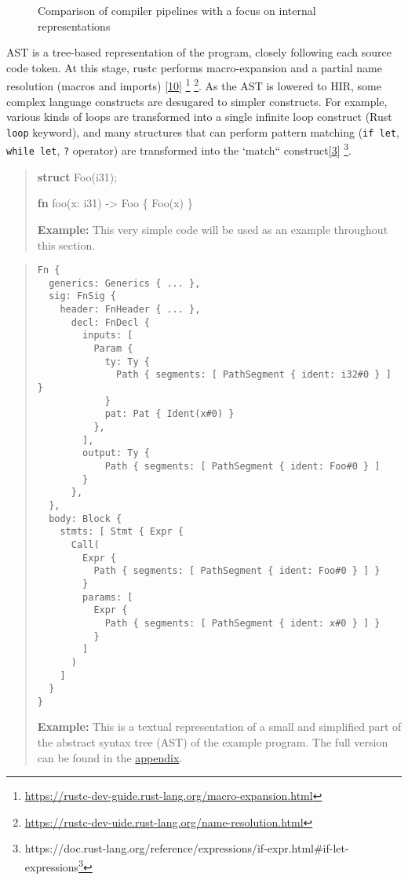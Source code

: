 \documentclass[
  11pt,
  twoside,symmetric]{report}
\newenvironment{Shaded}{}{}
\newcommand{\KeywordTok}[1]{\textbf{#1}}
\newcommand{\NormalTok}[1]{#1}
\newcommand{\OperatorTok}[1]{#1}
\DeclareRobustCommand{\href}[2]{#2\footnote{\url{#1}}}
\begin{document}
\begin{figure}
\centering

\caption{Comparison of compiler pipelines with a focus on internal
representations}
\end{figure}

AST is a tree-based representation of the program, closely following
each source code token. At this stage, rustc performs macro-expansion
and a partial name resolution (macros and imports)
\protect\hyperlink{ref-devguide}{{[}10{]}} \footnote{\url{https://rustc-dev-guide.rust-lang.org/macro-expansion.html}}
\footnote{\url{https://rustc-dev-uide.rust-lang.org/name-resolution.html}}.
As the AST is lowered to HIR, some complex language constructs are
desugared to simpler constructs. For example, various kinds of loops are
transformed into a single infinite loop construct (Rust \texttt{loop}
keyword), and many structures that can perform pattern matching
(\texttt{if\ let}, \texttt{while\ let}, \texttt{?} operator) are
transformed into the `match``
construct\protect\hyperlink{ref-reference}{{[}3{]}} \footnote{\href{https://doc.rust-lang.\%20org/reference/expressions/if-expr.html\#if-let-expressions}{https://doc.rust-lang.org/reference/expressions/if-expr.html\#if-let-expressions}}.

\begin{quote}
\begin{Shaded}
\begin{Highlighting}[]
\KeywordTok{struct}\NormalTok{ Foo(i31)}\OperatorTok{;}

\KeywordTok{fn}\NormalTok{ foo(x}\OperatorTok{:}\NormalTok{ i31) }\OperatorTok{{-}\textgreater{}}\NormalTok{ Foo }\OperatorTok{\{}
\NormalTok{    Foo(x)}
\OperatorTok{\}}
\end{Highlighting}
\end{Shaded}

\textbf{Example:} This very simple code will be used as an example
throughout this section.
\end{quote}

\begin{quote}
\begin{verbatim}
Fn {
  generics: Generics { ... },
  sig: FnSig {
    header: FnHeader { ... },
      decl: FnDecl {
        inputs: [
          Param {
            ty: Ty {
              Path { segments: [ PathSegment { ident: i32#0 } ] }
            }
            pat: Pat { Ident(x#0) }
          },
        ],
        output: Ty {
            Path { segments: [ PathSegment { ident: Foo#0 } ]
        }
      },
  },
  body: Block {
    stmts: [ Stmt { Expr {
      Call(
        Expr {
          Path { segments: [ PathSegment { ident: Foo#0 } ] }
        }
        params: [
          Expr {
            Path { segments: [ PathSegment { ident: x#0 } ] }
          }
        ]
      )
    ]
  }
}
\end{verbatim}

\textbf{Example:} This is a textual representation of a small and
simplified part of the abstract syntax tree (AST) of the example
program. The full version can be found in the
\protect\hyperlink{abstract-syntax-tree-ast}{appendix}.
\end{quote}
\end{document}
